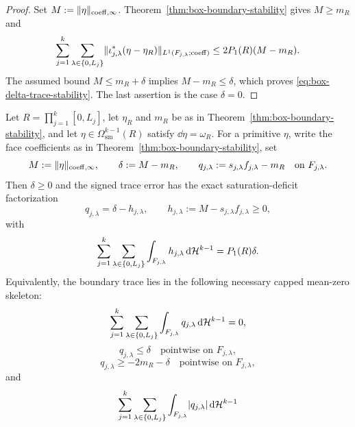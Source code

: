\begin{proof}
Set $M:=\lVert \eta \rVert_{\mathrm{coeff},\infty}$. Theorem~\ref{thm:box-boundary-stability}
gives $M\ge m_R$ and
\[
\sum_{j=1}^k\sum_{\lambda\in\{0,L_j\}}
\lVert \iota_{j,\lambda}^\ast(\eta-\eta_R) \rVert_{L^1(F_{j,\lambda};\mathrm{coeff})}
\le
2P_1(R)(M-m_R).
\]
The assumed bound $M\le m_R+\delta$ implies $M-m_R\le\delta$, which proves
\eqref{eq:box-delta-trace-stability}. The last assertion is the case
$\delta=0$.
\end{proof}

\begin{theorem}
\label{thm:box-minimizer-structure}
Let $R=\prod_{j=1}^k[0,L_j]$, let $\eta_R$ and $m_R$ be as in
Theorem~\ref{thm:box-boundary-stability}, and let
$\eta\in\Omega^{k-1}_{\mathrm{sm}}(R)$ satisfy $\dd\eta=\omega_R$. For a
primitive $\eta$, write the face coefficients as in
Theorem~\ref{thm:box-boundary-stability}, set
\[
M:=\lVert \eta \rVert_{\mathrm{coeff},\infty},
\qquad
\delta:=M-m_R,
\qquad
q_{j,\lambda}:=s_{j,\lambda}f_{j,\lambda}-m_R
\quad\text{on }F_{j,\lambda}.
\]
Then $\delta\ge0$ and the signed trace error has the exact saturation-deficit
factorization
\begin{equation}
\label{eq:trace-skeleton-factorization}
q_{j,\lambda}=\delta-h_{j,\lambda},
\qquad
h_{j,\lambda}:=M-s_{j,\lambda}f_{j,\lambda}\ge0,
\end{equation}
with
\begin{equation}
\label{eq:trace-skeleton-deficit-mass}
\sum_{j=1}^k\sum_{\lambda\in\{0,L_j\}}
\int_{F_{j,\lambda}}h_{j,\lambda}\,\mathrm{d}\mathcal{H}^{k-1}=P_1(R)\delta .
\end{equation}
Equivalently, the boundary trace lies in the following necessary capped
mean-zero skeleton:
\begin{equation}
\label{eq:trace-skeleton-mean-zero}
\sum_{j=1}^k\sum_{\lambda\in\{0,L_j\}}
\int_{F_{j,\lambda}}q_{j,\lambda}\,\mathrm{d}\mathcal{H}^{k-1}=0,
\end{equation}
\begin{equation}
\label{eq:trace-skeleton-cap}
q_{j,\lambda}\le \delta\quad\text{pointwise on }F_{j,\lambda},
\end{equation}
\begin{equation}
\label{eq:trace-skeleton-lower-cap}
q_{j,\lambda}\ge -2m_R-\delta\quad\text{pointwise on }F_{j,\lambda},
\end{equation}
and
\begin{equation}
\label{eq:trace-skeleton-variation}
\sum_{j=1}^k\sum_{\lambda\in\{0,L_j\}}
\int_{F_{j,\lambda}}\abs{q_{j,\lambda}}\,\dd\Haus^{k-1}

\end{equation}
\end{theorem}

